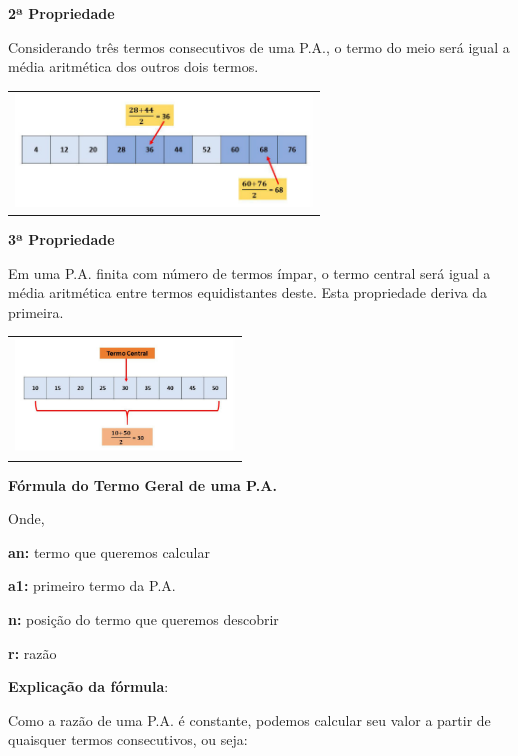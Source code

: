 \begin{multicols*}{2}
    \textbf{2ª Propriedade}
    
    Considerando três termos consecutivos de uma P.A., o termo do meio será igual a média aritmética dos outros dois termos.
    
        	\begin{tabular}{@{}c@{}}
      		\includegraphics[height=30mm]{assets/papropriedade2.jpg}
    		\end{tabular}
	
	\textbf{3ª Propriedade}

	Em uma P.A. finita com número de termos ímpar, o termo central será igual a média aritmética entre termos equidistantes deste. Esta propriedade deriva da primeira.
	
        	\begin{tabular}{@{}c@{}}
      		\includegraphics[height=30mm]{assets/papropriedade3.jpg}
    		\end{tabular}
	
\textbf{Fórmula do Termo Geral de uma P.A.}

	
Onde,

\textbf{an:} termo que queremos calcular

\textbf{a1:} primeiro termo da P.A.

\textbf{n:} posição do termo que queremos descobrir

\textbf{r:} razão

\textbf{Explicação da fórmula}:

Como a razão de uma P.A. é constante, podemos calcular seu valor a partir de quaisquer termos consecutivos, ou seja:




\end{multicols*}
